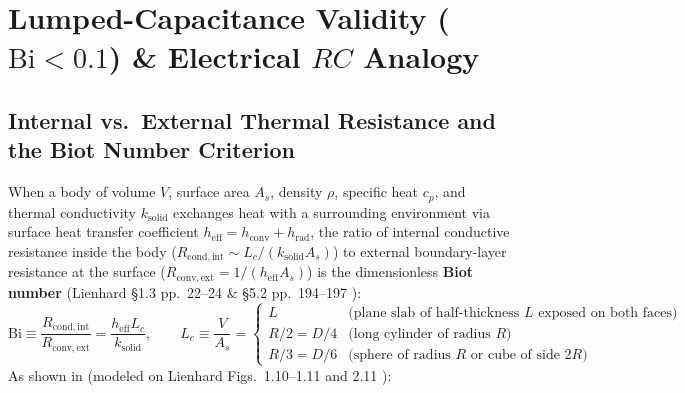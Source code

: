 \section{Lumped-Capacitance Validity ($\mathrm{Bi} < 0.1$) \& Electrical $RC$ Analogy}
\label{sec:13.1}

\subsection{Internal vs.\ External Thermal Resistance and the Biot Number Criterion}
When a body of volume $V$, surface area $A_s$, density $\rho$, specific heat $c_p$, and thermal conductivity $k_{\mathrm{solid}}$ exchanges heat with a surrounding environment via surface heat transfer coefficient $h_{\mathrm{eff}} = h_{\mathrm{conv}} + h_{\mathrm{rad}}$, the ratio of internal conductive resistance inside the body ($R_{\mathrm{cond,int}} \sim L_c / (k_{\mathrm{solid}}A_s)$) to external boundary-layer resistance at the surface ($R_{\mathrm{conv,ext}} = 1/(h_{\mathrm{eff}}A_s)$) is the dimensionless \textbf{Biot number} (Lienhard §1.3 pp.~22--24 \& §5.2 pp.~194--197 ):
\begin{equation}
  \mathrm{Bi} \equiv \frac{R_{\mathrm{cond,int}}}{R_{\mathrm{conv,ext}}} = \frac{h_{\mathrm{eff}} L_c}{k_{\mathrm{solid}}}, \qquad L_c \equiv \frac{V}{A_s} = \begin{cases} L & \text{(plane slab of half-thickness } L\text{ exposed on both faces)} \\ R/2 = D/4 & \text{(long cylinder of radius } R\text{)} \\ R/3 = D/6 & \text{(sphere of radius } R\text{ or cube of side } 2R\text{)} \end{cases}
  \label{eq:13:biot-def}
\end{equation}
As shown in  (modeled on Lienhard Figs.~1.10--1.11 and 2.11 ):

